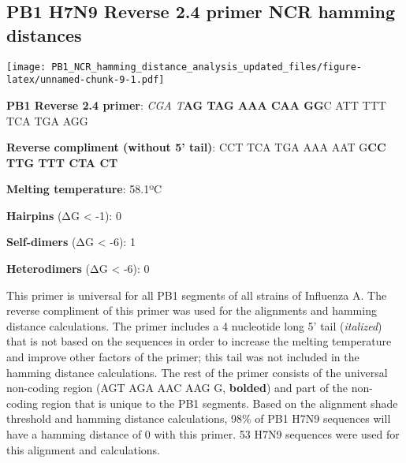 \documentclass[
]{article}
\newenvironment{Shaded}{\begin{snugshade}}{\end{snugshade}}
\newcommand{\AttributeTok}[1]{\textcolor[rgb]{0.77,0.63,0.00}{#1}}
\newcommand{\DecValTok}[1]{\textcolor[rgb]{0.00,0.00,0.81}{#1}}
\newcommand{\FunctionTok}[1]{\textcolor[rgb]{0.00,0.00,0.00}{#1}}
\newcommand{\NormalTok}[1]{#1}
\newcommand{\OtherTok}[1]{\textcolor[rgb]{0.56,0.35,0.01}{#1}}
\newcommand{\SpecialCharTok}[1]{\textcolor[rgb]{0.00,0.00,0.00}{#1}}
\newcommand{\StringTok}[1]{\textcolor[rgb]{0.31,0.60,0.02}{#1}}
\begin{document}
\hypertarget{pb1-h7n9-reverse-2.4-primer-ncr-hamming-distances}{%
\subsection{PB1 H7N9 Reverse 2.4 primer NCR hamming
distances}\label{pb1-h7n9-reverse-2.4-primer-ncr-hamming-distances}}

\begin{Shaded}
\end{Shaded}

\texttt{[image: PB1\_NCR\_hamming\_distance\_analysis\_updated\_files/figure-latex/unnamed-chunk-9-1.pdf]}

\textbf{PB1 Reverse 2.4 primer}: \emph{CGA T}\textbf{AG TAG AAA CAA GG}C
ATT TTT TCA TGA AGG

\textbf{Reverse compliment (without 5' tail)}: CCT TCA TGA AAA AAT
G\textbf{CC TTG TTT CTA CT}

\textbf{Melting temperature}: 58.1ºC

\textbf{Hairpins} (ΔG \textless{} -1): 0

\textbf{Self-dimers} (ΔG \textless{} -6): 1

\textbf{Heterodimers} (ΔG \textless{} -6): 0

This primer is universal for all PB1 segments of all strains of
Influenza A. The reverse compliment of this primer was used for the
alignments and hamming distance calculations. The primer includes a 4
nucleotide long 5' tail (\emph{italized}) that is not based on the
sequences in order to increase the melting temperature and improve other
factors of the primer; this tail was not included in the hamming
distance calculations. The rest of the primer consists of the universal
non-coding region (AGT AGA AAC AAG G, \textbf{bolded}) and part of the
non-coding region that is unique to the PB1 segments. Based on the
alignment shade threshold and hamming distance calculations, 98\% of PB1
H7N9 sequences will have a hamming distance of 0 with this primer. 53
H7N9 sequences were used for this alignment and calculations.
\end{document}
